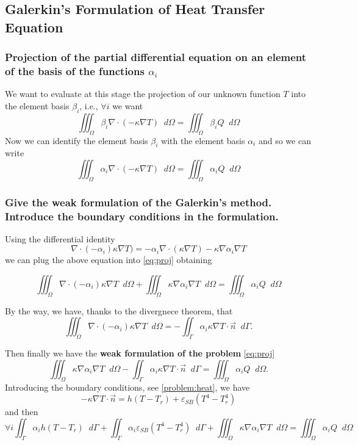 \documentclass{article}
\newcommand{\diff}{\mathop{}\!d}
\begin{document}
\subsection{Galerkin’s Formulation of Heat Transfer Equation}
\subsubsection{Projection of the partial differential equation on an element of the basis of the functions $ \alpha_i $}
We want to evaluate at this stage the projection of our unknown function $ T $ into the element basis $ \beta_i $, i.e., $ \forall i $ we want 
\begin{equation}
\label{eq:proj}
\iiint_{\Omega}\beta_i\nabla\cdot(-\kappa\nabla T)\diff\Omega=\iiint_{\Omega}\beta_i Q\diff\Omega
\end{equation} 
Now we can identify the element basis $ \beta_i $ with the element basis $ \alpha_i $ and so we can write  
\[\iiint_{\Omega}\alpha_i\nabla\cdot(-\kappa\nabla T)\diff\Omega=\iiint_{\Omega}\alpha_i Q\diff\Omega \]

\subsubsection{Give the weak formulation of the Galerkin’s method. Introduce the boundary conditions in the formulation.}
Using the differential identity 
\[\nabla\cdot(-\alpha_i)\kappa\nabla T)=-\alpha_i\nabla\cdot(\kappa\nabla T)-\kappa\nabla\alpha_i\nabla T\]
we can plug the above equation into \eqref{eq:proj} obtaining 

\[\iiint_{\Omega}\nabla\cdot(-\alpha_i)\kappa\nabla T\diff\Omega+\iiint_{\Omega}\kappa\nabla\alpha_i\nabla T\diff\Omega=\iiint_{\Omega}\alpha_i Q\diff\Omega\]

By the way, we have, thanks to the divergnece theorem, that 
\[\iiint_{\Omega}\nabla\cdot(-\alpha_i)\kappa\nabla T\diff\Omega=-\iint_{\Gamma}\alpha_i\kappa\nabla T\cdot\vec{n}\diff\Gamma. \]

Then finally we have the \textbf{weak formulation of the problem} \eqref{eq:proj}
\[ \iiint_{\Omega}\kappa\nabla\alpha_i\nabla T\diff\Omega-\iint_{\Gamma}\alpha_i\kappa\nabla T\cdot\vec{n}\diff\Gamma=\iiint_{\Omega}\alpha_i Q\diff\Omega. \]
Introducing the boundary conditions, see \eqref{problem:heat}, we have
\[-\kappa\nabla T\cdot \vec{n}=h(T-T_r)+\varepsilon_{SB}(T^4-T_r^4)\]
and then 
\begin{equation}
\forall i \iint_{\Gamma}\alpha_i h(T-T_r)\diff\Gamma+\iint_{\Gamma}\alpha_i\varepsilon_{SB}(T^4-T_r^4)\diff\Gamma+ \iiint_{\Omega}\kappa\nabla\alpha_i\nabla T\diff\Omega =\iiint_{\Omega}\alpha_i Q\diff\Omega
\end{equation}
\end{document}
